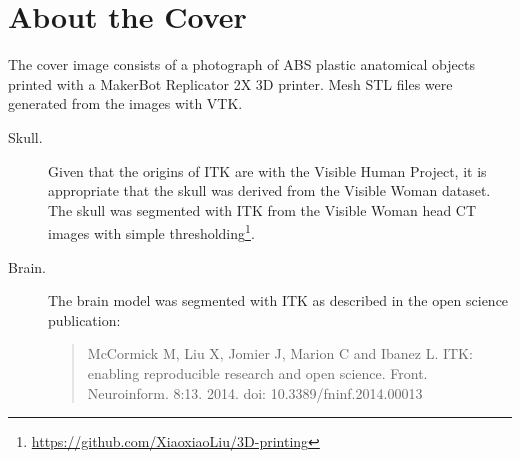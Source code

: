 \small

\chapter*{About the Cover}

The cover image consists of a photograph of ABS plastic anatomical objects
printed with a MakerBot Replicator 2X 3D printer. Mesh STL files were generated from the images with VTK.

\begin{description}

\item [Skull.]
Given that the origins of ITK are with the Visible Human Project, it is
appropriate that the skull was derived from the Visible Woman dataset. The
skull was segmented with ITK from the Visible Woman head CT images with simple
thresholding\footnote{\url{https://github.com/XiaoxiaoLiu/3D-printing}}.

\item[Brain.]
The brain model was segmented with ITK as described in the open science
publication:
\begin{quote}
McCormick M, Liu X, Jomier J, Marion C and Ibanez L. ITK:
enabling reproducible research and open science. Front. Neuroinform. 8:13.
2014. doi: 10.3389/fninf.2014.00013
\end{quote}

\end{description}

\normalsize
